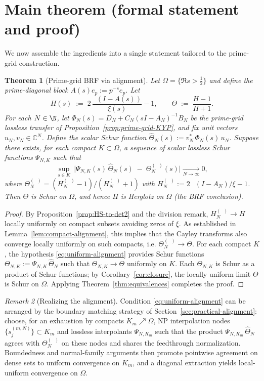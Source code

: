 \documentclass[11pt]{article}
\newtheorem{theorem}{Theorem}
\theoremstyle{remark}
\newtheorem{remark}[theorem]{Remark}
\newcommand{\C}{\mathbb{C}}
\DeclareMathOperator{\dettwo}{det_2}
\begin{document}
\section{Main theorem (formal statement and proof)}\label{sec:main-theorem}
We now assemble the ingredients into a single statement tailored to the prime-grid construction.

\begin{theorem}[Prime-grid BRF via alignment]\label{thm:prime-grid-BRF}
Let \(\Omega=\{\Re s>\tfrac12\}\) and define the prime-diagonal block \(A(s)e_p:=p^{-s}e_p\). Let
\[
 H(s)\;:=\;2\,\frac{\dettwo(I-A(s))}{\xi(s)}-1,\qquad \Theta\;:=\;\frac{H-1}{H+1}.
\]
For each \(N\in\N\), let \(\Phi_N(s)=D_N+C_N(sI-A_N)^{-1}B_N\) be the prime-grid lossless transfer of Proposition~\ref{prop:prime-grid-KYP}, and fix unit vectors \(u_N,v_N\in\C^N\). Define the scalar Schur function \(\widehat\Theta_N(s):=v_N^*\,\Phi_N(s)\,u_N\). Suppose there exists, for each compact \(K\subset\Omega\), a sequence of scalar lossless Schur functions \(\Psi_{N,K}\) such that
\begin{equation}\label{eq:uniform-alignment}
 \sup_{s\in K}\ \big|\Psi_{N,K}(s)\,\widehat\Theta_N(s)\; -\; \Theta_N^{(\dettwo)}(s)\big|\xrightarrow[N\to\infty]{}0,
\end{equation}
where \(\Theta_N^{(\dettwo)}=(H_N^{(\dettwo)}-1)/(H_N^{(\dettwo)}+1)\) with \(H_N^{(\dettwo)}:=2\,\dettwo(I-A_N)/\xi-1\). Then \(\Theta\) is Schur on \(\Omega\), and hence \(H\) is Herglotz on \(\Omega\) (the BRF conclusion).
\end{theorem}
\begin{proof}
By Proposition~\ref{prop:HS-to-det2} and the division remark, \(H_N^{(\dettwo)}\to H\) locally uniformly on compact subsets avoiding zeros of \(\xi\). As established in Lemma~\ref{lem:compact-alignment}, this implies that the Cayley transforms also converge locally uniformly on such compacts, i.e. \(\Theta_N^{(\dettwo)}\to\Theta\). For each compact \(K\), the hypothesis \eqref{eq:uniform-alignment} provides Schur functions \(\Theta_{N,K}:=\Psi_{N,K}\,\widehat\Theta_N\) such that \(\Theta_{N,K}\to\Theta\) uniformly on \(K\). Each \(\Theta_{N,K}\) is Schur as a product of Schur functions; by Corollary~\ref{cor:closure}, the locally uniform limit \(\Theta\) is Schur on \(\Omega\). Applying Theorem~\ref{thm:equivalences} completes the proof.
\end{proof}

\begin{remark}[Realizing the alignment]
Condition \eqref{eq:uniform-alignment} can be arranged by the boundary matching strategy of Section~\ref{sec:practical-alignment}: choose, for an exhaustion by compacts \(K_m\nearrow\Omega\), NP interpolation nodes \(\{s_{j}^{(m,N)}\}\subset K_m\) and lossless interpolants \(\Psi_{N,K_m}\) such that the product \(\Psi_{N,K_m}\,\widehat\Theta_N\) agrees with \(\Theta_N^{(\dettwo)}\) on these nodes and shares the feedthrough normalization. Boundedness and normal-family arguments then promote pointwise agreement on dense sets to uniform convergence on \(K_m\), and a diagonal extraction yields local-uniform convergence on \(\Omega\).
\end{remark}
\end{document}
